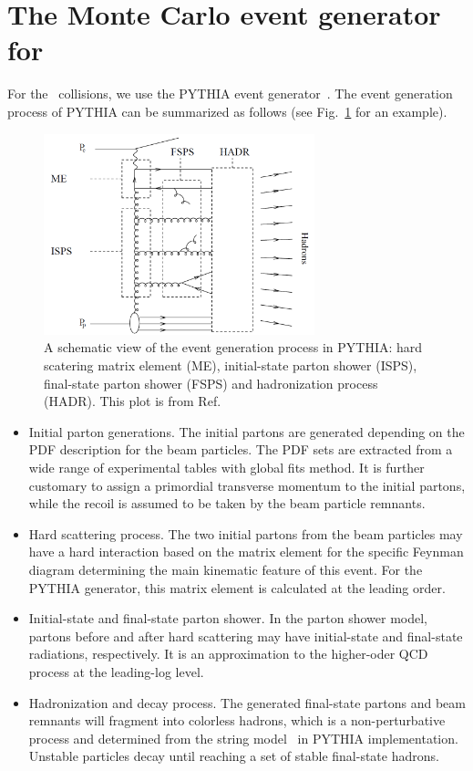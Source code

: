 \section{The Monte Carlo event generator for \ep\ } \label{sec:MC_ep}
For the \ep\ collisions, we use the PYTHIA event generator~\cite{Sjostrand:2006za}. The event generation
process of PYTHIA can be summarized as follows (see Fig.~\ref{fig:PYTHIA_generation_scheme} for an example).
\begin{figure}
\centering
\includegraphics[width=0.7\textwidth]{plots/chpt5/PYTHIA_generation_scheme.png}
\caption[An illustration of the event generation process in PYTHIA] {
A schematic view of the event generation process in PYTHIA: hard scatering matrix element (ME), 
initial-state parton shower (ISPS), final-state parton shower (FSPS) and hadronization process (HADR). 
This plot is from Ref.~\cite{Hansson:2007zz} }
\label{fig:PYTHIA_generation_scheme}
\end{figure}
\begin{itemize}
\item Initial parton generations. The initial partons are generated depending
on the PDF description for the beam particles. The PDF sets are extracted from
a wide range of experimental tables with global fits method. It is further customary to assign a primordial transverse momentum to the initial partons, while the recoil is assumed to be taken by the beam particle remnants. 
\item Hard scattering process. The two initial partons from the beam particles may
have a hard interaction based on the matrix element for the specific Feynman diagram
determining the main kinematic feature of this event. For the PYTHIA generator, this
matrix element is calculated at the leading order.
\item Initial-state and final-state parton shower. In the parton shower model, partons
before and after hard scattering may have initial-state and final-state radiations, respectively. It
is an approximation to the higher-oder QCD process at the leading-log level. 
\item Hadronization and decay process. The generated final-state partons and
beam remnants will fragment into colorless hadrons, which is a non-perturbative process
and determined from the string model~\cite{Andersson:1983ia} in PYTHIA implementation. Unstable particles decay
until reaching a set of stable final-state hadrons.
\end{itemize}


